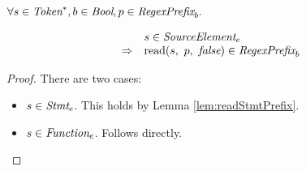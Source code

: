 \documentclass[preprint,10pt]{sigplanconf}
\begin{document}
\begin{lemma}\mbox{}
  
  \( \forall s \in \textit{Token}^*, b \in \textit{Bool}, p \in \textit{RegexPrefix}_b. \)

  \[
  \begin{array}{rl}
  &s \in \textit{SourceElement}_{e} 
  \\
  \Rightarrow &
  \textrm{read}(s,~p,~\textit{false}) \in \textit{RegexPrefix}_b
  \end{array}
  \]
\end{lemma}
\begin{proof}
  There are two cases:
  \begin{itemize}
  \item \( s \in \textit{Stmt}_{e} \). This holds by
    Lemma \ref{lem:readStmtPrefix}.

  \item \( s \in \textit{Function}_{e} \). Follows directly.
  \end{itemize}
\end{proof}
\end{document}
